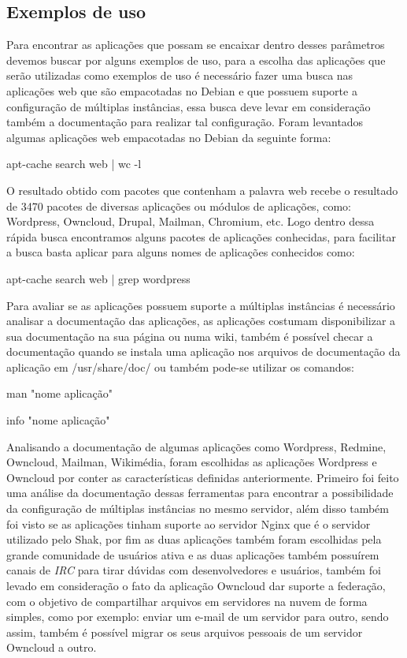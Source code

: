 \subsection{Exemplos de uso}
\label{subsection:exemplos}

Para encontrar as aplicações que possam se encaixar dentro desses parâmetros
devemos buscar por alguns exemplos de uso, para a escolha das aplicações que
serão utilizadas como exemplos de uso é necessário fazer uma busca nas aplicações
web que são empacotadas no Debian e que possuem suporte a configuração de múltiplas
instâncias, essa busca deve levar em consideração também a documentação para realizar
tal configuração. Foram levantados algumas aplicações web empacotadas no Debian da
seguinte forma:

\begin{center}
apt-cache search web | wc -l
\end{center}

O resultado obtido com pacotes que contenham a palavra web recebe o resultado de 3470
pacotes de diversas aplicações ou módulos de aplicações, como:
Wordpress, Owncloud, Drupal, Mailman, Chromium, etc. Logo dentro dessa rápida busca
encontramos alguns pacotes de aplicações conhecidas, para facilitar a busca basta
aplicar para alguns nomes de aplicações conhecidos como:

\begin{center}
apt-cache search web | grep wordpress
\end{center}

Para avaliar se as aplicações possuem suporte a múltiplas instâncias é necessário
analisar a documentação das aplicações, as aplicações costumam disponibilizar a sua
documentação na sua página ou numa wiki, também é possível checar a documentação
quando se instala uma aplicação nos arquivos de documentação da aplicação em
/usr/share/doc/ ou também pode-se utilizar os comandos:

\begin{center}
man "nome aplicação"

info "nome aplicação"
\end{center}

Analisando a documentação de algumas aplicações como Wordpress, Redmine,
Owncloud, Mailman, Wikimédia, foram escolhidas as aplicações Wordpress e Owncloud por
conter as características definidas anteriormente. Primeiro
foi feito uma análise da documentação dessas ferramentas para encontrar a
possibilidade da configuração de múltiplas instâncias no mesmo servidor, além
disso também foi visto se as aplicações tinham suporte ao servidor Nginx que é
o servidor utilizado pelo Shak, por fim as duas aplicações também foram escolhidas
pela grande comunidade de usuários ativa e as duas aplicações também possuírem
canais de \textit{IRC} para tirar dúvidas com desenvolvedores e usuários, também foi levado
em consideração o fato da  aplicação Owncloud dar suporte a federação,
com  o objetivo de compartilhar arquivos em servidores na nuvem de forma simples,
como por exemplo: enviar um e-mail de um servidor para outro, sendo assim,
também é possível migrar os seus arquivos pessoais de um servidor Owncloud a outro.

